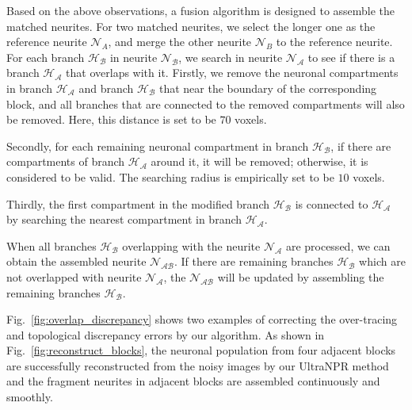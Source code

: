 Based on the above observations, a fusion algorithm is designed to assemble the matched neurites.
For two matched neurites, we select the longer one as the reference neurite $\mathcal{N}_A$, and merge the other neurite $\mathcal{N}_B$ to the reference neurite.
%
For each branch $\mathcal{H_B}$ in neurite $\mathcal{N_B}$, we search in neurite $\mathcal{N_A}$ to see if there is a branch $\mathcal{H_A}$ that overlaps with it.
%
Firstly, we remove the neuronal compartments in branch $\mathcal{H_A}$ and branch $\mathcal{H_B}$ that near the boundary of the corresponding block, and all branches that are connected to the removed compartments will also be removed. Here, this distance is set to be $70$ voxels.

Secondly, for each remaining neuronal compartment in branch $\mathcal{H_B}$, if there are compartments of branch $\mathcal{H_A}$ around it, it will be removed; otherwise, it is considered to be valid. The searching radius is empirically set to be $10$ voxels.


 
Thirdly, the first compartment  in the modified branch $\mathcal{H_B}$ is connected to $\mathcal{H_A}$ by searching the nearest compartment in branch $\mathcal{H_A}$. 
 
When all branches $\mathcal{H_B}$ overlapping with the neurite $\mathcal{N_A}$ are processed, we can obtain the assembled neurite $\mathcal{N_{AB}}$.
If there are remaining branches $\mathcal{H_B}$ which are not overlapped with neurite $\mathcal{N_A}$, the $\mathcal{N_{AB}}$ will be updated by assembling the remaining branches $\mathcal{H_B}$.



Fig.~\ref{fig:overlap_discrepancy} shows two examples of correcting the over-tracing and topological discrepancy errors by our algorithm.
As shown in Fig.~\ref{fig:reconstruct_blocks}, the neuronal population from four adjacent blocks are successfully reconstructed from the noisy images by our UltraNPR method and the fragment neurites in adjacent blocks are assembled continuously and smoothly.


